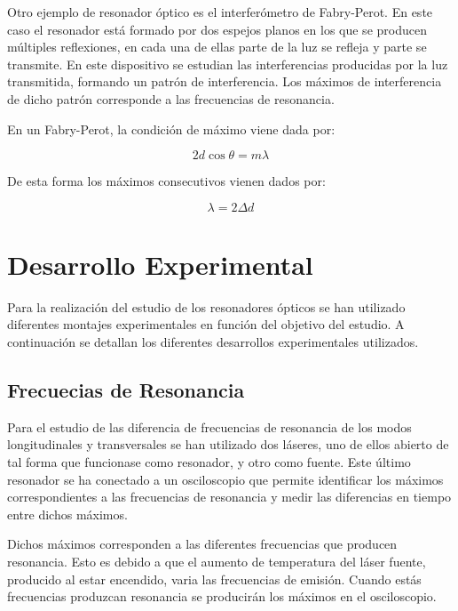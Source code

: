 \documentclass[twoside]{article}
\begin{document}
\begin{multicols}{2}
			Otro ejemplo de resonador óptico es el interferómetro de Fabry-Perot. En este caso el resonador está formado por dos espejos planos en los que se producen múltiples reflexiones, en cada una de ellas parte de la luz se refleja y parte se transmite. En este dispositivo se estudian las interferencias producidas por la luz transmitida, formando un patrón de interferencia. Los máximos de interferencia de dicho patrón corresponde a las frecuencias de resonancia.

			En un Fabry-Perot, la condición de máximo viene dada por:

				\begin{equation}
					2d\cos \theta = m\lambda
				\end{equation}

			De esta forma los máximos consecutivos vienen dados por:

				\begin{equation}
					\lambda = 2 \Delta d
					\label{eq:fp}
				\end{equation}

		\section{Desarrollo Experimental}

			Para la realización del estudio de los resonadores ópticos se han utilizado diferentes montajes experimentales en función del objetivo del estudio. A continuación se detallan los diferentes desarrollos experimentales utilizados.

			\subsection{Frecuecias de Resonancia}

				Para el estudio de las diferencia de frecuencias de resonancia de los modos longitudinales y transversales se han utilizado dos láseres, uno de ellos abierto de tal forma que funcionase como resonador, y otro como fuente. Este último resonador se ha conectado a un osciloscopio que permite identificar los máximos correspondientes a las frecuencias de resonancia y medir las diferencias en tiempo entre dichos máximos.

				Dichos máximos corresponden a las diferentes frecuencias que producen resonancia. Esto es debido a que el aumento de temperatura del láser fuente, producido al estar encendido, varia las frecuencias de emisión. Cuando estás frecuencias produzcan resonancia se producirán los máximos en el osciloscopio.


\end{multicols}
\end{document}
